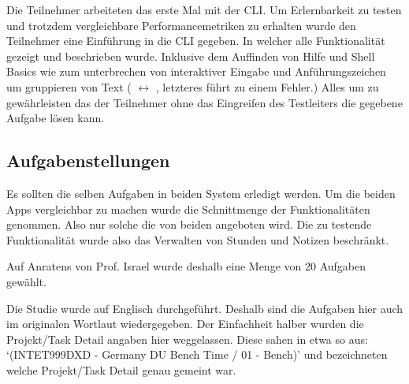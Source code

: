 \documentclass[oneside,bibliography=totocnumbered,BCOR=5mm]{scrbook}
\begin{document}
\medskip

Die Teilnehmer arbeiteten das erste Mal mit der CLI. Um Erlernbarkeit zu
testen und trotzdem vergleichbare Performancemetriken zu erhalten wurde den
Teilnehmer eine Einführung in die CLI gegeben. In welcher alle Funktionalität
gezeigt und beschrieben wurde. Inklusive dem Auffinden von Hilfe und Shell
Basics wie  zum unterbrechen von interaktiver Eingabe
und Anführungszeichen um gruppieren von Text (
$\leftrightarrow$ , letzteres führt zu einem Fehler.)
Alles um zu gewährleisten das der Teilnehmer ohne das Eingreifen des Testleiters
die gegebene Aufgabe lösen kann.

\subsection{Aufgabenstellungen}
\label{aufgaben}

Es sollten die selben Aufgaben in beiden System erledigt werden. Um die beiden
Apps vergleichbar zu machen wurde die Schnittmenge der Funktionalitäten
genommen. Also nur solche die von beiden angeboten wird. Die zu testende
Funktionalität wurde also das Verwalten von Stunden und Notizen beschränkt.

\smallskip

Auf Anratens von Prof. Israel wurde deshalb eine
Menge von 20 Aufgaben gewählt.

\smallskip

Die Studie wurde auf Englisch durchgeführt. Deshalb sind die Aufgaben hier
auch im originalen Wortlaut wiedergegeben. Der Einfachheit halber wurden die
Projekt/Task Detail angaben hier weggelassen. Diese sahen in etwa so aus:
`(INTET999DXD - Germany DU Bench Time / 01 - Bench)' und bezeichneten welche
Projekt/Task Detail genau gemeint war.
\end{document}

